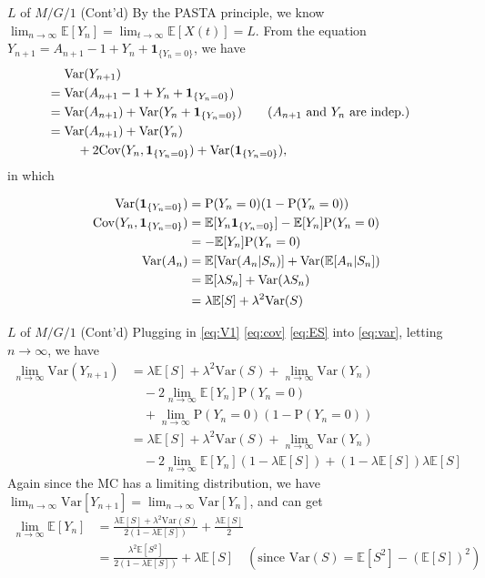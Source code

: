 \documentclass[letterpaper]{beamer}
\def\p{\mathrm P}
\def\E{\mathbb E}
\def\V{\mathrm{Var}}
\def\CV{\mathrm{Cov}}
\begin{document}
\begin{frame}{$L$ of $M/G/1$ (Cont'd)}
By the PASTA principle, we know $\displaystyle\lim_{n\to\infty}\E[Y_n]=\lim_{t\to\infty}\E[X(t)]=L$.
From the equation $Y_{n+1}=A_{n+1}-1+Y_n+\mathbf{1}_{\{Y_n=0\}}$, we have
\begin{align}
&\V(Y_{n+1})\cr
={}&\V(A_{n+1}-1+Y_n+\mathbf{1}_{\{Y_n=0\}})\cr
={}&\V(A_{n+1})+\V(Y_n+\mathbf{1}_{\{Y_n=0\}})\qquad(\mbox{$A_{n+1}$ and $Y_n$ are indep.})\cr
={}&\V(A_{n+1})+\V(Y_n)\cr
&\quad+2\CV(Y_n,\mathbf{1}_{\{Y_n=0\}})+\V(\mathbf{1}_{\{Y_n=0\}}),&\label{eq:var}
\end{align}
in which

\vspace{-18pt}
\begin{align}
\V(\mathbf{1}_{\{Y_n=0\}})&=\p(Y_n=0)(1-\p(Y_n=0))\label{eq:V1}\\
\CV(Y_n,\mathbf{1}_{\{Y_n=0\}})
&=\E[{Y_n\mathbf{1}_{\{Y_n=0\}}}]-\E[Y_n]\p(Y_n=0)\cr
&=-\E[Y_n]\p(Y_n=0)\label{eq:cov}\\
\V(A_n)&=\E[\V(A_n|S_n)]+\V(\E[A_n|S_n])\cr
&=\E[\lambda S_n]+\V(\lambda S_n)\cr
&=\lambda \E[S]+\lambda^2\V(S)\label{eq:ES}
\end{align}

\end{frame}
\begin{frame}{$L$ of $M/G/1$ (Cont'd)}
Plugging in \eqref{eq:V1} \eqref{eq:cov} \eqref{eq:ES} into \eqref{eq:var}, letting $n\to\infty$, we have
\begin{align*}
\lim_{n\to\infty}\V(Y_{n+1})&=\lambda \E[S]+\lambda^2\V(S)+\lim_{n\to\infty}\V(Y_n)\\
&\quad-2\lim_{n\to\infty}\E[Y_n]\p(Y_n=0)\\
&\quad+\lim_{n\to\infty}\p(Y_n=0)(1-\p(Y_n=0))\\
&=\lambda \E[S]+\lambda^2\V(S)+\lim_{n\to\infty}\V(Y_n)\\
&\quad-2\lim_{n\to\infty}\E[Y_n](1-\lambda\E[S])+(1-\lambda\E[S])\lambda\E[S]
\end{align*}
Again since the MC has a limiting distribution, we have $\lim_{n\to\infty}\V[Y_{n+1}]=\lim_{n\to\infty}\V[Y_n]$,
and can get
\begin{align*}
\lim_{n\to\infty}\E[Y_n]&=\frac{\lambda \E[S]+\lambda^2\V(S)}{2(1-\lambda\E[S])}+\frac{\lambda\E[S]}{2}\\
&=\frac{\lambda^2\E[S^2]}{2(1-\lambda\E[S])}+\lambda\E[S]\quad (\text{since }\V(S)=\E[S^2]-(\E[S])^2)
\end{align*}
\end{frame}
\end{document}

